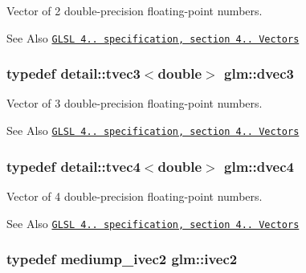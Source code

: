 Vector of 2 double-\/precision floating-\/point numbers. 

\begin{DoxySeeAlso}{See Also}
\href{http://www.opengl.org/registry/doc/GLSLangSpec.4.20.8.pdf}{\tt G\-L\-S\-L 4.. specification, section 4.. Vectors} 
\end{DoxySeeAlso}
\hypertarget{group__core__types_ga140a8656fbb8b19382f109c5d5869856}{
\subsubsection[{dvec3}]{\setlength{\rightskip}{0pt plus 5cm}typedef detail\-::tvec3$<$double$>$ {\bf glm\-::dvec3}}}\label{group__core__types_ga140a8656fbb8b19382f109c5d5869856}


Vector of 3 double-\/precision floating-\/point numbers. 

\begin{DoxySeeAlso}{See Also}
\href{http://www.opengl.org/registry/doc/GLSLangSpec.4.20.8.pdf}{\tt G\-L\-S\-L 4.. specification, section 4.. Vectors} 
\end{DoxySeeAlso}
\hypertarget{group__core__types_ga0127b78c4c51b270b2a2ef848c01b5d9}{
\subsubsection[{dvec4}]{\setlength{\rightskip}{0pt plus 5cm}typedef detail\-::tvec4$<$double$>$ {\bf glm\-::dvec4}}}\label{group__core__types_ga0127b78c4c51b270b2a2ef848c01b5d9}


Vector of 4 double-\/precision floating-\/point numbers. 

\begin{DoxySeeAlso}{See Also}
\href{http://www.opengl.org/registry/doc/GLSLangSpec.4.20.8.pdf}{\tt G\-L\-S\-L 4.. specification, section 4.. Vectors} 
\end{DoxySeeAlso}
\hypertarget{group__core__types_ga606b9d298d8aaa55c449182c340b4622}{
\subsubsection[{ivec2}]{\setlength{\rightskip}{0pt plus 5cm}typedef mediump\-\_\-ivec2 {\bf glm\-::ivec2}}}\label{group__core__types_ga606b9d298d8aaa55c449182c340b4622}


